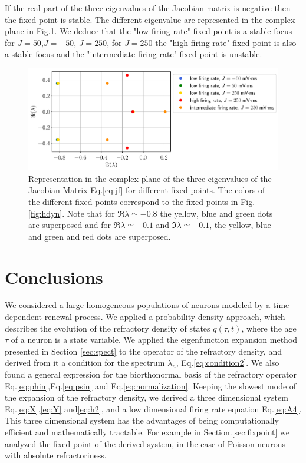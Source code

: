 \documentclass[12pt,twoside]{report}
\begin{document}
If the real part of the three eigenvalues of the Jacobian matrix is negative then the fixed point is stable. The different eigenvalue are represented in the complex plane in Fig.\ref{fig:eigv}. We deduce that the "low firing rate" fixed point is a stable focus for $J=50$,$J=-50$, $J=250$, for $J=250$ the "high firing rate" fixed point is also a stable focus and the "intermediate firing rate" fixed point is unstable.

\begin{figure}[h!]
	\centering
	\includegraphics[width=0.8\linewidth]{hdyn_eig.pdf}
	\caption{Representation in the complex plane of the three eigenvalues of the Jacobian Matrix Eq.\eqref{eq:jf} for different fixed points. The colors of the different fixed points correspond to the fixed points in Fig.\ref{fig:hdyn}. Note that for $\Re{\lambda}\simeq-0.8$ the yellow, blue and green dots are superposed and for $\Re{\lambda}\simeq-0.1$ and $\Im{\lambda}\simeq-0.1$, the yellow, blue and green and red dots are superposed.
	}
	\label{fig:eigv}
\end{figure}


\chapter{Conclusions}

We considered a large homogeneous populations of neurons modeled by a time dependent renewal process. We applied a probability density approach, which describes the evolution of the refractory density of states $q(\tau,t)$, where the age $\tau$ of a neuron is a state variable. We applied the eigenfunction expansion method presented in Section \ref{sec:spect} to the operator of the refractory density, and derived from it a condition for the spectrum $\lambda_n$, Eq.\eqref{eq:condition2}. We also found a general expression for the biorthonormal basis of the refractory operator Eq.\eqref{eq:phin},Eq.\eqref{eq:psin}  and Eq.\eqref{eq:normalization}.
Keeping the slowest mode of the  expansion of the refractory density, we derived a three dimensional system Eq.\eqref{eq:X},\eqref{eq:Y} and\eqref{eq:h2}, and a low dimensional firing rate equation Eq.\eqref{eq:A4}. This three dimensional system has the advantages of being computationally efficient and mathematically tractable. For example in Section.\ref{sec:fixpoint} we analyzed the fixed point of the derived system, in the case of Poisson neurons with absolute refractoriness.\\
\end{document}
